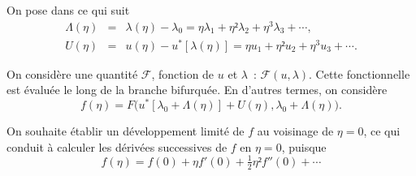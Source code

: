 \documentclass[12pt, final]{amsart}
\begin{document}
On pose dans ce qui suit
\begin{eqnarray}
  \label{eq:20211112155446}
  \Lambda (\eta )&=&\lambda (\eta )-\lambda _0=\eta \lambda _1+\eta ²\lambda _2+\eta ^3\lambda _3+\cdots,\\
  \label{eq:20211112113028}
  U(\eta )&=&u(\eta )-u^*[\lambda (\eta )]=\eta u_1+\eta ²u_2+\eta ^3u_3+\cdots.
\end{eqnarray}

On considère une quantité \(\mathcal{F}\), fonction de \(u\) et \(\lambda \)~: \(\mathcal{F}(u,
\lambda )\). Cette fonctionnelle est évaluée le long de la branche bifurquée. En
d'autres termes, on considère
\begin{equation}
  f(\eta )=F\bigl(u^*[\lambda _0+\Lambda (\eta )]+U(\eta ), \lambda _0+\Lambda (\eta )\bigr).
\end{equation}

On souhaite établir un développement limité de \(f\) au voisinage de \(\eta =0\),
ce qui conduit à calculer les dérivées successives de \(f\) en \(\eta =0\), puisque
\begin{equation}
  f(\eta )=f(0)+\eta  f'(0)+\tfrac12\eta ²f''(0)+\cdots
\end{equation}
\end{document}
